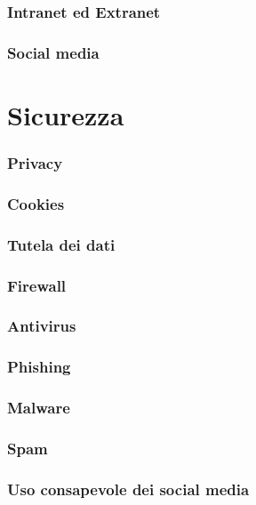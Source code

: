\documentclass[handout]{beamer}
\begin{document}
\begin{frame}
\frametitle{Intranet ed Extranet}

  

\end{frame}

\begin{frame}
\frametitle{Social media}

  

\end{frame}


\section{Sicurezza}



\begin{frame}
\frametitle{Privacy}

  

\end{frame}

\begin{frame}
\frametitle{Cookies}

  

\end{frame}


\begin{frame}
\frametitle{Tutela dei dati}

  

\end{frame}





\begin{frame}
\frametitle{Firewall}

  

\end{frame}





\begin{frame}
\frametitle{Antivirus}

  

\end{frame}




\begin{frame}
\frametitle{Phishing}

  

\end{frame}






\begin{frame}
\frametitle{Malware}

  

\end{frame}







\begin{frame}
\frametitle{Spam}



\end{frame}





\begin{frame}
\frametitle{Uso consapevole dei social media}

  

\end{frame}
\end{document}
